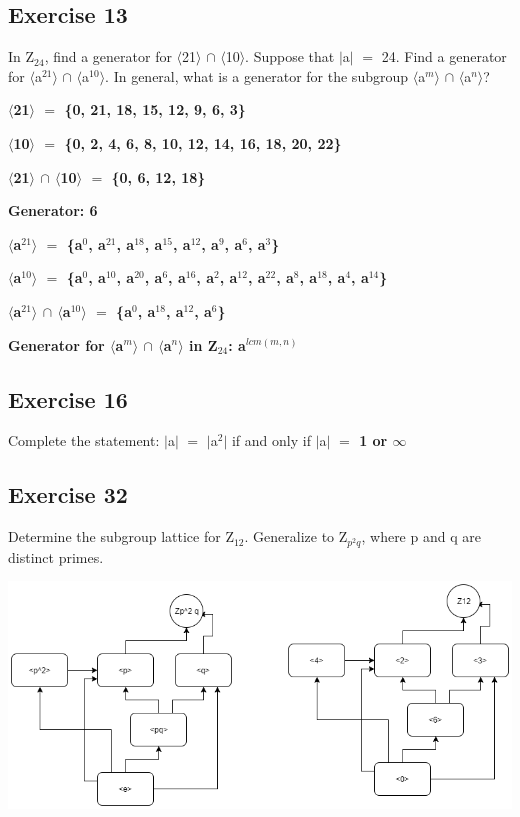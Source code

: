 \documentclass{article}
\newcommand{\mt}[1]{\ensuremath{#1}}
\newcommand\ssc[2][\DefaultOpt]{%
  \def\DefaultOpt{#2}%
  \subsection[#1]{#2}%
}
\newcommand{\av}[1]{\mt{|}#1\mt{|}}  %
\newcommand{\bk}[1]{\{#1\}}
\newcommand{\abk}[1]{\mt{\langle}#1\mt{\rangle}}
\newcommand{\eql}{\mt{=} }
\newcommand{\uw}[2]{#1\mt{_{#2}}}
\newcommand{\uf}[2]{#1\mt{^{#2}}}
\newcommand{\infy}{\mt{\infty} }
\newcommand{\inn}{\mt{\cap} }
\begin{document}
\ssc{Exercise 13}{
	In \uw{Z}{24}, find a generator for \abk{21} \inn \abk{10}. Suppose that \av{a} \eql 24. Find a generator for \abk{\uf{a}{21}} \inn \abk{\uf{a}{10}}. In general, what is a generator for the subgroup \abk{\uf{a}{m}} \inn \abk{\uf{a}{n}}?
	
	\textbf{\abk{21} \eql \bk{0, 21, 18, 15, 12, 9, 6, 3}}
		
	\textbf{\abk{10} \eql \bk{0, 2, 4, 6, 8, 10, 12, 14, 16, 18, 20, 22}}
	
	\textbf{\abk{21} \inn \abk{10} \eql \bk{0, 6, 12, 18}}
	
	\textbf{Generator: 6}
	
	\textbf{\abk{\uf{a}{21}} \eql \bk{\uf{a}{0}, \uf{a}{21}, \uf{a}{18}, \uf{a}{15}, \uf{a}{12}, \uf{a}{9}, \uf{a}{6}, \uf{a}{3}}}
		
	\textbf{\abk{\uf{a}{10}} \eql \bk{\uf{a}{0}, \uf{a}{10}, \uf{a}{20}, \uf{a}{6}, \uf{a}{16}, \uf{a}{2}, \uf{a}{12}, \uf{a}{22}, \uf{a}{8}, \uf{a}{18}, \uf{a}{4}, \uf{a}{14}}}
	
	\textbf{\abk{\uf{a}{21}} \inn \abk{\uf{a}{10}} \eql \bk{\uf{a}{0}, \uf{a}{18}, \uf{a}{12},  \uf{a}{6}}}
		
	\textbf{Generator for \abk{\uf{a}{m}} \inn \abk{\uf{a}{n}} in \uw{Z}{24}: \uf{a}{lcm(m, n)}}
}

\ssc{Exercise 16}{
	Complete the statement: \av{a} \eql \av{\uf{a}{2}} if and only if \av{a} \textbf{\eql 1 or \infy}
}

\ssc{Exercise 32}{
	Determine the subgroup lattice for \uw{Z}{12}. Generalize to \uw{Z}{\uf{p}{2}q}, where p and q are distinct primes.
}

\includegraphics[scale=0.65]{ex32.png}
\end{document}
